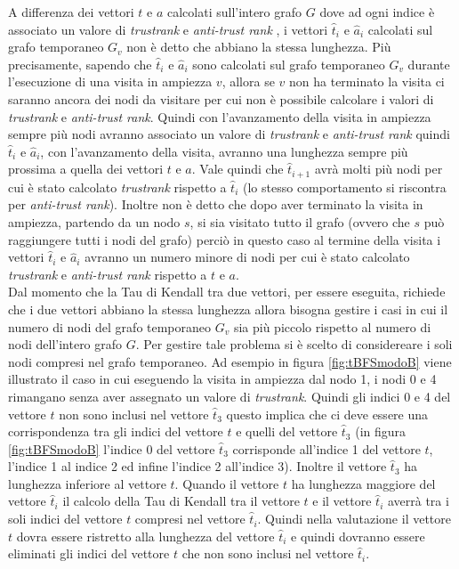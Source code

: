 A differenza dei vettori \(t\) e \(a\) calcolati sull'intero grafo \(G\) dove ad ogni indice è associato un valore di \textit{trustrank} e \textit{anti-trust rank} , i vettori \(\hat{t}_i\) e \(\hat{a}_i\) calcolati sul grafo temporaneo \(G_v\) non è detto che abbiano la stessa lunghezza. Più precisamente, sapendo che \(\hat{t}_i\) e \(\hat{a}_i\) sono calcolati sul grafo temporaneo \(G_v\) durante l'esecuzione di una visita in ampiezza \(v\), allora se \(v\) non ha terminato la visita ci saranno ancora dei nodi da visitare per cui non è possibile calcolare i valori di \textit{trustrank} e \textit{anti-trust rank}. Quindi con l'avanzamento della visita in ampiezza sempre più nodi avranno associato un valore di \textit{trustrank} e \textit{anti-trust rank} quindi \(\hat{t}_i\) e \(\hat{a}_i\), con l'avanzamento della visita, avranno una lunghezza sempre più prossima a quella dei vettori \(t\) e \(a\). Vale quindi che \(\hat{t}_{i+1}\) avrà molti più nodi per cui è stato calcolato \textit{trustrank} rispetto a 
\(\hat{t}_i\) (lo stesso comportamento si riscontra per \textit{anti-trust rank}). Inoltre non è detto che dopo aver terminato la visita in ampiezza, partendo da un nodo \(s\), si sia visitato tutto il grafo (ovvero che \(s\) può raggiungere tutti i nodi del grafo) perciò in questo caso al termine della visita i vettori \(\hat{t}_i\) e \(\hat{a}_i\) avranno un numero minore di nodi per cui è stato calcolato \textit{trustrank} e \textit{anti-trust rank} rispetto a \(t\) e \(a\).\\
Dal momento che la Tau di Kendall tra due vettori, per essere eseguita, richiede che i due vettori abbiano la stessa lunghezza allora bisogna gestire i casi in cui il numero di nodi del grafo temporaneo \(G_v\) sia più piccolo rispetto al numero di nodi dell'intero grafo \(G\).  Per gestire tale problema si è scelto di considereare i soli nodi compresi nel grafo temporaneo. Ad esempio in figura \ref{fig:tBFSmodoB} viene illustrato il caso in cui eseguendo la visita in ampiezza dal nodo 1, i nodi 0 e 4 rimangano senza aver assegnato un valore di \textit{trustrank}. Quindi gli indici 0 e 4 del vettore \(t\) non sono inclusi nel vettore \(\hat{t}_3\) questo implica che ci deve essere una corrispondenza tra gli indici del vettore \(t\) e quelli del vettore \(\hat{t}_3\) (in figura \ref{fig:tBFSmodoB} l'indice 0 del vettore \(\hat{t}_3\) corrisponde all'indice 1 del vettore \(t\), l'indice 1 al indice 2 ed infine l'indice 2 all'indice 3).  Inoltre  il vettore \(\hat{t}_3\) ha lunghezza inferiore al vettore \(t\). 
Quando il vettore \(t\) ha lunghezza maggiore del vettore \(\hat{t}_i\) il calcolo della Tau di Kendall tra il vettore \(t\) e il vettore \(\hat{t}_i\) averrà tra i soli indici del vettore \(t\) compresi nel vettore \(\hat{t}_i\). Quindi  nella valutazione  il vettore \(t\) dovra essere ristretto alla lunghezza del vettore \(\hat{t}_i\) e quindi dovranno essere eliminati gli indici del vettore \(t\) che non sono inclusi nel vettore \(\hat{t}_i\).
